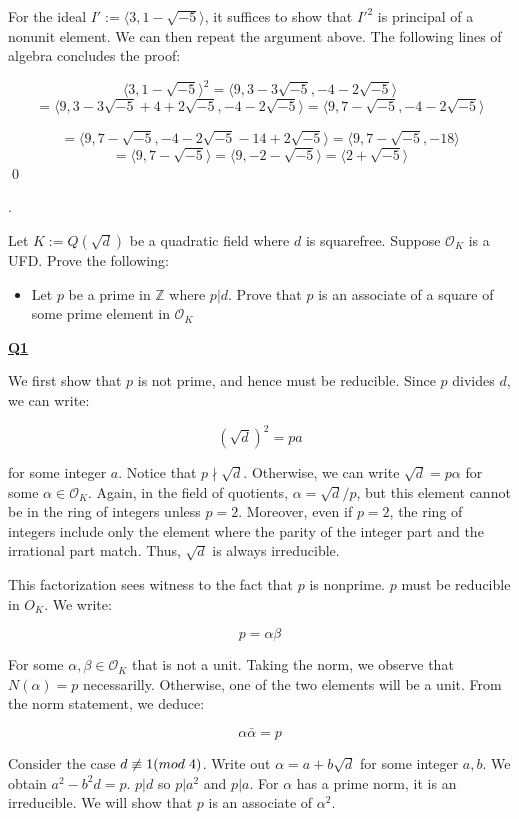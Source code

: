\documentclass{article}
\newcommand{\new}[1]{
    \vspace{2mm}
    \noindent
    \textbf{
    \underline{#1}}
}
\def\ZZ{{\mathbb{Z}}}
\def\_{{\hspace{1mm}}}
\newcounter{problemcnt}
\newcommand{\Problem}{{
    \vspace{5mm}
    \stepcounter{problemcnt}
    \noindent
    \arabic{problemcnt}. 
}
}
\newcommand{\<}{{{
    \langle
}}}
\def\>{{{
    \rangle
}}}
\def\ZZ{{\mathbb{Z}}}
\newcommand{\ringInt}{
    {\mathcal{O}}
}
\begin{document}
\vspace{3mm}
For the ideal $I' := \<3, 1-\sqrt{-5}\>$, it suffices 
to show that $I'^2$ is principal of a nonunit element. 
We can then repeat the argument above. The following 
lines of algebra concludes the proof:


\[
    \<3, 1-\sqrt{-5}\>^2 = \<9, 3-3\sqrt{-5}, -4-2\sqrt{-5}\>
\]\[
    = \<9, 3-3\sqrt{-5} +4 + 2\sqrt{-5}, -4-2\sqrt{-5}\> 
    = \<9, 7-\sqrt{-5}, -4-2\sqrt{-5}\> 
\]

\[
    = \<9, 7-\sqrt{-5}, -4-2\sqrt{-5}-14+2\sqrt{-5}\>
    = \<9, 7-\sqrt{-5}, -18\> 
\]
\[
    = \<9, 7-\sqrt{-5}\> = \<9, -2-\sqrt{-5}\>
    = \<2+\sqrt{-5}\>
\]
\qed


\newpage

\Problem
Let $K:=Q(\sqrt{d})$ be a quadratic field where $d$ is 
squarefree. Suppose $\ringInt_K$ is a UFD. Prove the following:
\begin{itemize}
    \item Let $p$ be a prime in $\ZZ$ where 
    $p|d$. Prove that $p$ 
    is an associate of a square of some prime element 
    in $\ringInt_K$
\end{itemize}

\new{Q1}
We first show that $p$ is not prime, and hence must be reducible. 
Since $p$ divides $d$, we can write:

\[
    (\sqrt{d})^2 = pa
\]

for some integer $a$. Notice that $p \nmid \sqrt{d}$. Otherwise, 
we can write $\sqrt{d} = p\alpha$ for some $\alpha \in \ringInt_K$.
Again, in the field of quotients, $\alpha = \sqrt{d}/p$, but 
this element cannot be in the ring of integers unless $p = 2$.
Moreover, even if $p = 2$, the ring of integers include only the 
element where the parity of the integer part and the irrational part 
match. Thus, $\sqrt{d}$ is always irreducible. 

This factorization sees witness to the fact that 
$p$ is nonprime. $p$ must be reducible in $O_K$. We write:

\[
    p = \alpha \beta
\]

For some $\alpha, \beta \in \ringInt_K$ that is not a unit. 
Taking the norm, we observe that $N(\alpha) = p$ necessarilly. 
Otherwise, one of the two elements will be a unit. From the norm 
statement, we deduce:

\[
    \alpha \bar{\alpha} = p
\]

Consider the case $d \not\equiv 1 (mod \_ 4)$. 
Write out $\alpha  = a+b\sqrt{d}$ for some integer $a, b$. We obtain 
$a^2-b^2d = p$. $p|d$ so $p|a^2$ and $p|a$. For $\alpha$ has a prime norm, it is an irreducible. 
We will show that $p$ is an associate of $\alpha^2$. 
\end{document}
